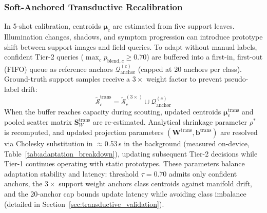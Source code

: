 \documentclass[preprint,12pt]{elsarticle}
\begin{document}
\subsubsection{Soft-Anchored Transductive Recalibration}
\label{sec:transductive}
In 5-shot calibration, centroids $\boldsymbol{\mu}_c$ are estimated from five support leaves. Illumination changes, shadows, and symptom progression can introduce prototype shift between support images and field queries. To adapt without manual labels, confident Tier-2 queries ($\max_c p_{\text{blend}, c} \ge 0.70$) are buffered into a first-in, first-out (FIFO) queue as reference anchors $\mathcal{Q}_{\text{anchor}}^{(c)}$ (capped at 20 anchors per class). Ground-truth support samples receive a $3\times$ weight factor to prevent pseudo-label drift:
\begin{equation}
    \tilde{\mathcal{S}}_c^{\text{trans}} = \tilde{\mathcal{S}}_c^{(3\times)} \cup \mathcal{Q}_{\text{anchor}}^{(c)}
\end{equation}
When the buffer reaches capacity during scouting, updated centroids $\boldsymbol{\mu}_c^{\text{trans}}$ and pooled scatter matrix $\mathbf{S}_W^{\text{trans}}$ are re-estimated. Analytical shrinkage parameter $\rho^*$ is recomputed, and updated projection parameters $(\mathbf{W}^{\text{trans}}, \mathbf{b}^{\text{trans}})$ are resolved via Cholesky substitution in $\approx$0.53\,s in the background (measured on-device, Table~\ref{tab:adaptation_breakdown}), updating subsequent Tier-2 decisions while Tier-1 continues operating with static prototypes. These parameters balance adaptation stability and latency: threshold $\tau = 0.70$ admits only confident anchors, the $3\times$ support weight anchors class centroids against manifold drift, and the 20-anchor cap bounds update latency while avoiding class imbalance (detailed in Section~\ref{sec:transductive_validation}).
\end{document}
